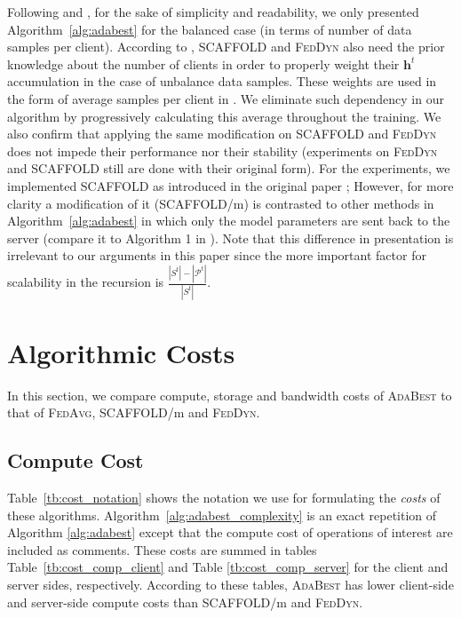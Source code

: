 \documentclass[runningheads]{llncs}
\def\algref#1{Algorithm~\ref{#1}}
\def\vh{{\bm{h}}}
\def\gP{{\mathcal{P}}}
\newcommand{\fedavg}{\textsc{FedAvg}\xspace}
\newcommand{\scaffold}{\textsc{SCAFFOLD}\xspace}
\newcommand{\feddyn}{\textsc{FedDyn}\xspace}
\newcommand{\ours}{\textsc{AdaBest}\xspace}
\begin{document}
Following \cite{karimireddy2020scaffold} and \cite{acar2021federated}, for the sake of
simplicity and readability, we only presented \algref{alg:adabest} for the balanced
case (in terms of number of data samples per client).
According to \cite{feddynacar}, \scaffold and \feddyn also need the prior
knowledge about the number of clients in order to properly weight their $\vh^t$
accumulation in the case of unbalance data samples.
These weights are used in the form of average samples per client in \cite{feddynacar}.
We eliminate such dependency in our algorithm by progressively calculating this average
throughout the training.
We also confirm that applying the same modification on \scaffold and \feddyn
does not impede their performance nor their stability (experiments on \feddyn and
\scaffold still are done with their original form).
For the experiments, we implemented \scaffold as introduced in the original paper
\cite{karimireddy2020scaffold}; However, for more clarity a modification of it
(\scaffold/m) is contrasted to other methods in \algref{alg:adabest} in which
only the model parameters are sent back to the server (compare it to Algorithm 1 in \cite{karimireddy2020scaffold}).
Note that this difference in presentation is irrelevant to our arguments in this
paper since the more important factor for scalability in the recursion is
$\frac{|S^t|-|\gP^t|}{|S^t|}$.

\section{Algorithmic Costs}
In this section, we compare compute, storage and bandwidth costs of \ours to
that of \fedavg, \scaffold/m and \feddyn. 


\subsection{Compute Cost}
Table~\ref{tb:cost_notation} shows the notation we use for formulating the
\textit{costs} of these algorithms.
Algorithm~\ref{alg:adabest_complexity} is an exact repetition of Algorithm
\ref{alg:adabest} except that the compute cost of operations of interest are included
as comments.
These costs are summed in tables Table~\ref{tb:cost_comp_client} and Table
\ref{tb:cost_comp_server} for the client and server sides, respectively.
According to these tables, \ours has lower client-side and server-side compute
costs than \scaffold/m and \feddyn. 
\end{document}

